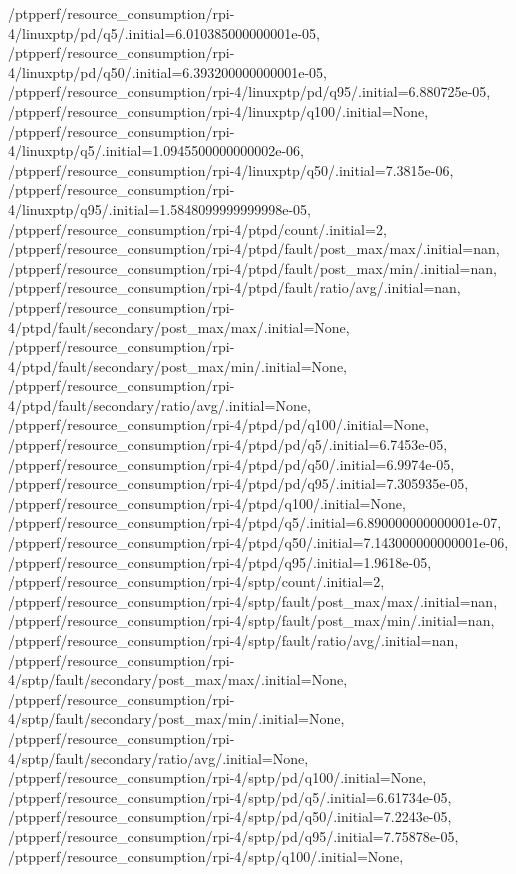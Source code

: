 {    /ptpperf/resource_consumption/rpi-4/linuxptp/pd/q5/.initial=6.010385000000001e-05,
    /ptpperf/resource_consumption/rpi-4/linuxptp/pd/q50/.initial=6.393200000000001e-05,
    /ptpperf/resource_consumption/rpi-4/linuxptp/pd/q95/.initial=6.880725e-05,
    /ptpperf/resource_consumption/rpi-4/linuxptp/q100/.initial=None,
    /ptpperf/resource_consumption/rpi-4/linuxptp/q5/.initial=1.0945500000000002e-06,
    /ptpperf/resource_consumption/rpi-4/linuxptp/q50/.initial=7.3815e-06,
    /ptpperf/resource_consumption/rpi-4/linuxptp/q95/.initial=1.5848099999999998e-05,
    /ptpperf/resource_consumption/rpi-4/ptpd/count/.initial=2,
    /ptpperf/resource_consumption/rpi-4/ptpd/fault/post_max/max/.initial=nan,
    /ptpperf/resource_consumption/rpi-4/ptpd/fault/post_max/min/.initial=nan,
    /ptpperf/resource_consumption/rpi-4/ptpd/fault/ratio/avg/.initial=nan,
    /ptpperf/resource_consumption/rpi-4/ptpd/fault/secondary/post_max/max/.initial=None,
    /ptpperf/resource_consumption/rpi-4/ptpd/fault/secondary/post_max/min/.initial=None,
    /ptpperf/resource_consumption/rpi-4/ptpd/fault/secondary/ratio/avg/.initial=None,
    /ptpperf/resource_consumption/rpi-4/ptpd/pd/q100/.initial=None,
    /ptpperf/resource_consumption/rpi-4/ptpd/pd/q5/.initial=6.7453e-05,
    /ptpperf/resource_consumption/rpi-4/ptpd/pd/q50/.initial=6.9974e-05,
    /ptpperf/resource_consumption/rpi-4/ptpd/pd/q95/.initial=7.305935e-05,
    /ptpperf/resource_consumption/rpi-4/ptpd/q100/.initial=None,
    /ptpperf/resource_consumption/rpi-4/ptpd/q5/.initial=6.890000000000001e-07,
    /ptpperf/resource_consumption/rpi-4/ptpd/q50/.initial=7.143000000000001e-06,
    /ptpperf/resource_consumption/rpi-4/ptpd/q95/.initial=1.9618e-05,
    /ptpperf/resource_consumption/rpi-4/sptp/count/.initial=2,
    /ptpperf/resource_consumption/rpi-4/sptp/fault/post_max/max/.initial=nan,
    /ptpperf/resource_consumption/rpi-4/sptp/fault/post_max/min/.initial=nan,
    /ptpperf/resource_consumption/rpi-4/sptp/fault/ratio/avg/.initial=nan,
    /ptpperf/resource_consumption/rpi-4/sptp/fault/secondary/post_max/max/.initial=None,
    /ptpperf/resource_consumption/rpi-4/sptp/fault/secondary/post_max/min/.initial=None,
    /ptpperf/resource_consumption/rpi-4/sptp/fault/secondary/ratio/avg/.initial=None,
    /ptpperf/resource_consumption/rpi-4/sptp/pd/q100/.initial=None,
    /ptpperf/resource_consumption/rpi-4/sptp/pd/q5/.initial=6.61734e-05,
    /ptpperf/resource_consumption/rpi-4/sptp/pd/q50/.initial=7.2243e-05,
    /ptpperf/resource_consumption/rpi-4/sptp/pd/q95/.initial=7.75878e-05,
    /ptpperf/resource_consumption/rpi-4/sptp/q100/.initial=None,
}
